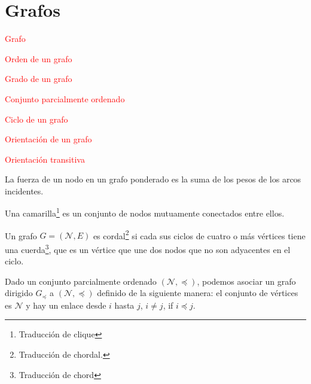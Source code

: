 \section{Grafos}

\begin{defi}
\textcolor{red}{Grafo}
\end{defi}

\begin{defi}
\textcolor{red}{Orden de un grafo}
\end{defi}

\begin{defi}
\textcolor{red}{Grado de un grafo}
\end{defi}

\begin{defi}
\textcolor{red}{Conjunto parcialmente ordenado}
\end{defi}

\begin{defi}
\textcolor{red}{Ciclo de un grafo}
\end{defi}

\begin{defi}
\textcolor{red}{Orientación de un grafo}
\end{defi}

\begin{defi}
\textcolor{red}{Orientación transitiva}
\end{defi}

\begin{defi}
La fuerza de un nodo en un grafo ponderado es la suma de los pesos de los arcos incidentes.
\end{defi}

\begin{defi}
Una camarilla\footnote{Traducción de clique} es un conjunto de nodos mutuamente conectados entre ellos.
\end{defi}

\begin{defi}
Un grafo $G = (\mathcal{N}, E)$ es cordal\footnote{Traducción de chordal.} si cada sus ciclos de cuatro o más vértices tiene una cuerda\footnote{Traducción de chord}, que es un vértice que une dos nodos que no son adyacentes en el ciclo.
\end{defi}

\begin{defi}
Dado un conjunto parcialmente ordenado $(\mathcal{N}, \preceq)$, podemos asociar un grafo dirigido $G_\preceq$ a $(\mathcal{N}, \preceq)$ definido de la siguiente manera: el conjunto de vértices es $\mathcal{N}$ y hay un enlace desde $i$ hasta $j$, $i \neq j$, if $i \preceq j$.
\end{defi}

